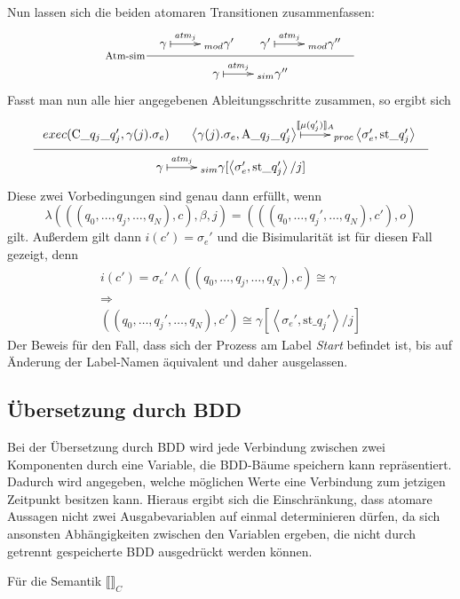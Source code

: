 Nun lassen sich die beiden atomaren Transitionen zusammenfassen:
\[
\inference[Atm-sim]{
  \xymatrix{ \gamma \ar@{|->}[r]^-{\mathit{atm}_j} & _{mod}
    \gamma'
  } &
  \xymatrix{ \gamma'\ar@{|->}[r]^-{\mathit{atm}_j} & _{mod}
    \gamma''
  }
}{
  \xymatrix{ \gamma \ar@{|->}[r]^-{\mathit{atm}_j} & _{sim}
    \gamma''
  }
}
\]
Fasst man nun alle hier angegebenen Ableitungsschritte zusammen, so ergibt sich
\[
\inference{
  exec(\textrm{C\_}q_j\textrm{\_}q_j',\gamma(j).\sigma_e) &
  \xymatrix{ \left<\gamma(j).\sigma_e,\textrm{A\_}q_j\textrm{\_}q_j'\right> \ar@{|->}[r]^-{\llbracket \mu(q_j')\rrbracket_A} & _{proc}
    \left<\sigma_e',\textrm{st\_}q_j'\right> }
}{
  \xymatrix{ \gamma \ar@{|->}[r]^-{\mathit{atm}_j} & _{sim}
    \gamma[\left<\sigma_e',\textrm{st\_}q_j'\right>/j]
  }
}
\]
Diese zwei Vorbedingungen sind genau dann erfüllt, wenn
\[ \lambda(((q_0,\dots,q_j,\dots,q_N),c),\beta,j) = (((q_0,\dots,q_j',\dots,q_N),c'),o) \]
gilt.
Außerdem gilt dann $i(c') = \sigma_e'$ und die Bisimularität ist für diesen Fall gezeigt, denn
\[
\begin{array}{c}
  i(c') = \sigma_e' \land ((q_0,\dots,q_j,\dots,q_N),c)\cong\gamma\\
  \Rightarrow\\
  ((q_0,\dots,q_j',\dots,q_N),c')\cong \gamma[\left<\sigma_e',\textrm{st\_}q_j'\right>/j]
\end{array}
\]
Der Beweis für den Fall, dass sich der Prozess am Label \emph{Start} befindet ist, bis auf Änderung der Label-Namen äquivalent und daher ausgelassen.
\subsection{Übersetzung durch BDD}
Bei der Übersetzung durch BDD wird jede Verbindung zwischen zwei Komponenten durch eine Variable, die BDD-Bäume speichern kann repräsentiert.
Dadurch wird angegeben, welche möglichen Werte eine Verbindung zum jetzigen Zeitpunkt besitzen kann.
Hieraus ergibt sich die Einschränkung, dass atomare Aussagen nicht zwei Ausgabevariablen auf einmal determinieren dürfen, da sich ansonsten Abhängigkeiten zwischen den Variablen ergeben, die nicht durch getrennt gespeicherte BDD ausgedrückt werden können.

Für die Semantik $\llbracket\rrbracket_C$ 